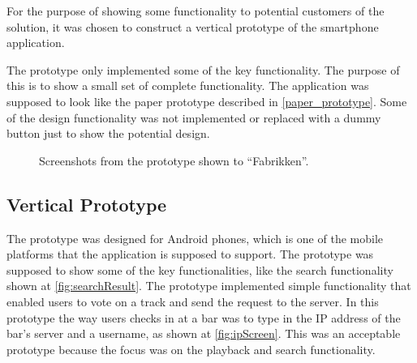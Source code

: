 For the purpose of showing some functionality to potential customers of the solution, it was chosen to construct a vertical prototype of the smartphone application.

The prototype only implemented some of the key functionality. The purpose of this is to show a small set of complete functionality. The application was supposed to look like the paper prototype described in \cref{paper_prototype}. Some of the design functionality was not implemented or replaced with a dummy button just to show the potential design.

\begin{figure}[hbtp]
  \centering
  \caption{Screenshots from the prototype shown to \enquote{Fabrikken}.}
\end{figure}

\subsection{Vertical Prototype}
\label{sub:vertical_prototype}

The prototype was designed for Android phones, which is one of the mobile platforms that the application is supposed to support. The prototype was supposed to show some of the key functionalities, like the search functionality shown at \cref{fig:searchResult}. The prototype implemented simple functionality that enabled users to vote on a track and send the request to the server. In this prototype the way users checks in at a bar was to type in the IP address of the bar's server and a username, as shown at \cref{fig:ipScreen}. This was an acceptable prototype because the focus was on the playback and search functionality.